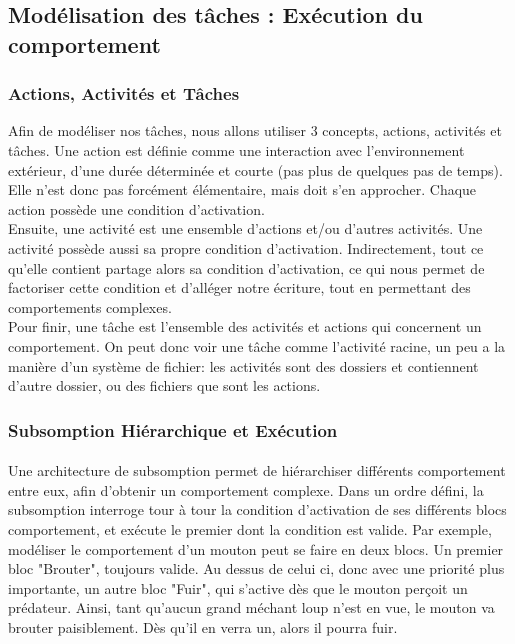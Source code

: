 \documentclass[10pt,a4paper]{article}
\begin{document}
	\subsection{Modélisation des tâches : Exécution du comportement}
		\subsubsection{Actions, Activités et Tâches}
			Afin de modéliser nos tâches, nous allons utiliser 3 concepts, actions, activités et tâches. Une action est définie comme une interaction avec l'environnement extérieur, d'une durée déterminée et courte (pas plus de quelques pas de temps). Elle n'est donc pas forcément élémentaire, mais doit s'en approcher. Chaque action possède une condition d'activation.\\
			Ensuite, une activité est une ensemble d'actions et/ou d'autres activités. Une activité possède aussi sa propre condition d'activation. Indirectement, tout ce qu'elle contient partage alors sa condition d'activation, ce qui nous permet de factoriser cette condition et d'alléger notre écriture, tout en permettant des comportements complexes.\\
			Pour finir, une tâche est l'ensemble des activités et actions qui concernent un comportement. On peut donc voir une tâche comme l'activité racine, un peu a la manière d'un système de fichier: les activités sont des dossiers et contiennent d'autre dossier, ou des fichiers que sont les actions.
		\subsubsection{Subsomption Hiérarchique et Exécution}
			\paragraph{}
			Une architecture de subsomption permet de hiérarchiser différents comportement entre eux, afin d'obtenir un comportement complexe. Dans un ordre défini, la subsomption interroge tour à tour la condition d'activation de ses différents blocs comportement, et exécute le premier dont la condition est valide. Par exemple, modéliser le comportement d'un mouton peut se faire en deux blocs. Un premier bloc "Brouter", toujours valide. Au dessus de celui ci, donc avec une priorité plus importante, un autre bloc "Fuir", qui s'active dès que le mouton perçoit un prédateur. Ainsi, tant qu'aucun grand méchant loup n'est en vue, le mouton va brouter paisiblement. Dès qu'il en verra un, alors il pourra fuir.
\end{document}
